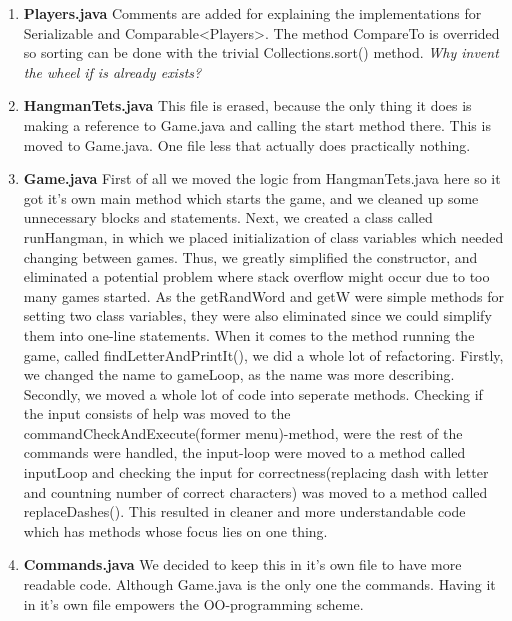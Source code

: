 \documentclass{article}
\begin{document}
\begin{enumerate}
	\item
	\textbf{Players.java}
	Comments are added for explaining the implementations for Serializable and Comparable<Players>.
	The method CompareTo is overrided so sorting can be done with the trivial Collections.sort() method. \textit{Why invent the wheel if is already exists?} %
	\item
	\textbf{HangmanTets.java}
	This file is erased, because the only thing it does is making a reference to Game.java and calling the start method there. This is moved to Game.java. One file less that actually does practically nothing.
	\item
	\textbf{Game.java}
	First of all we moved the logic from HangmanTets.java here so it got it's own main method which starts the game, and we cleaned up some unnecessary blocks and statements. Next, we
	created a class called runHangman, in which we placed initialization of class variables
	which needed changing between games. Thus, we greatly simplified the constructor, and
	eliminated a potential problem where stack overflow might occur due to too many games
	started. As the getRandWord and getW were simple methods for setting two class variables, they were also eliminated since we could simplify them into one-line statements. When it comes to the method running the game, called findLetterAndPrintIt(),
	we did a whole lot of refactoring. Firstly, we changed the name to gameLoop, as the name
	was more describing. Secondly, we moved a whole lot of code into seperate methods. Checking
	if the input consists of help was moved to the commandCheckAndExecute(former menu)-method, 
	were the rest of the commands were handled, the input-loop were moved to a method called
	inputLoop and checking the input for correctness(replacing dash with letter and countning 
	number of correct characters) was moved to a method called 
	replaceDashes(). This resulted in cleaner and more understandable code which has methods
	whose focus lies on one thing.

	\item%
	\textbf{Commands.java}
	We decided to keep this in it's own file to have more readable code. Although Game.java is the only one the commands. Having it in it's own file empowers the OO-programming scheme.

\end{enumerate}
\end{document}
